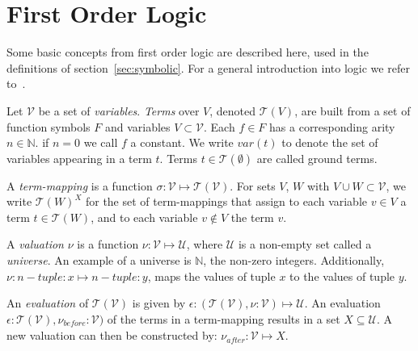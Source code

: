 \section{First Order Logic}\label{sec:first_order_logic}

Some basic concepts from first order logic are described here, used in the definitions of section~\ref{sec:symbolic}. For a general introduction into logic we refer to~\cite{Huth:logic}.
 
Let $\mathcal{V}$ be a set of \textit{variables}. \textit{Terms} over $V$, denoted $\mathcal{T}(V)$, are built from a set of function symbols $F$ and variables $V \subset \mathcal{V}$. Each $f\in F$ has a corresponding arity $n\in \mathbb{N}$. if $n = 0$ we call $f$ a constant. We write $var(t)$ to denote the set of variables appearing in a term $t$. Terms $t\in \mathcal{T}(\emptyset)$ are called ground terms.

A \textit{term-mapping} is a function $\sigma:\mathcal{V} \mapsto \mathcal{T}(\mathcal{V})$. For sets $V$, $W$ with $V \cup W \subset \mathcal{V}$, we write $\mathcal{T}(W)^X$ for the set of term-mappings that assign to each variable $v\in V$ a term $t\in \mathcal{T}(W)$, and to each variable $v \not\in V$ the term $v$.

A \textit{valuation} $\nu$ is a function $\nu:\mathcal{V} \mapsto \mathcal{U}$, where $\mathcal{U}$ is a non-empty set called a \textit{universe}. An example of a universe is $\mathbb{N}$, the non-zero integers. Additionally, $\nu:\mathit{n-tuple:x} \mapsto \mathit{n-tuple:y}$, maps the values of tuple $x$ to the values of tuple $y$.

An \textit{evaluation} of $\mathcal{T}(\mathcal{V})$ is given by $\epsilon:(\mathcal{T}(\mathcal{V}),\nu:\mathcal{V}) \mapsto \mathcal{U}$. An evaluation $\epsilon:\mathcal{T}(\mathcal{V}),\nu_\mathit{before}:\mathcal{V})$ of the terms in a term-mapping results in a set $X \subseteq \mathcal{U}$. A new valuation can then be constructed by: $\nu_\mathit{after}:\mathcal{V} \mapsto X$.
